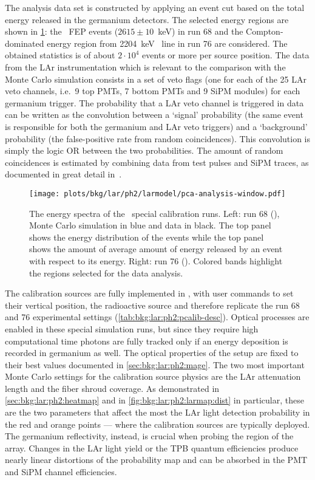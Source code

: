 The analysis data set is constructed by applying an event cut based on the total energy
released in the germanium detectors. The selected energy regions are shown in
\cref{fig:bkg:lar:ph2:pcalib-data}: the \Tl\ FEP events ($2615 \pm 10$~keV) in run 68 and
the Compton-dominated energy region from 2204~keV \Bih\ line in run 76 are considered. The
obtained statistics is of about $2 \cdot 10^4$ events or more per source position.
\newpar
The data from the LAr instrumentation which is relevant to the comparison with the Monte
Carlo simulation consists in a set of veto flags (one for each of the 25 LAr veto
channels, i.e.~9 top PMTs, 7 bottom PMTs and 9 SiPM modules) for each germanium trigger.
The probability that a LAr veto channel is triggered in data can be written as the
convolution between a `signal' probability (the same event is responsible for both the
germanium and LAr veto triggers) and a `background' probability (the false-positive rate
from random coincidences). This convolution is simply the logic OR between the two
probabilities. The amount of random coincidences is estimated by combining data from test
pulses and SiPM traces, as documented in great detail in~\cite{Wiesinger2021}.

\begin{figure}
  \centering
  \texttt{[image: plots/bkg/lar/ph2/larmodel/pca-analysis-window.pdf]}
  \caption{%
    The energy spectra of the \phasetwo\ special calibration runs. Left: run 68 (\Th),
    Monte Carlo simulation in blue and data in black. The top panel shows the energy
    distribution of the events while the top panel shows the amount of average amount of
    energy released by an event with respect to its energy. Right: run 76 (\Ra). Colored
    bands highlight the regions selected for the data analysis.
  }\label{fig:bkg:lar:ph2:pcalib-data}
\end{figure}

The calibration sources are fully implemented in \mage, with user commands to set their
vertical position, the radioactive source and therefore replicate the run 68 and 76
experimental settings (\cref{tab:bkg:lar:ph2:pcalib-desc}). Optical
processes are enabled in these special simulation runs, but since they require high
computational time photons are fully tracked only if an energy deposition is recorded in
germanium as well. The optical properties of the setup are fixed to their best values
documented in \cref{sec:bkg:lar:ph2:mage}. The two most important Monte Carlo settings
for the calibration source physics are the LAr attenuation length and the fiber shroud
coverage. As demonstrated in \cref{sec:bkg:lar:ph2:heatmap} and in
\cref{fig:bkg:lar:ph2:larmap:dist} in particular, these are the two parameters that affect
the most the LAr light detection probability in the red and orange points --- where the
calibration sources are typically deployed. The germanium reflectivity, instead, is
crucial when probing the region of the array. Changes in the LAr light yield or the TPB
quantum efficiencies produce nearly linear distortions of the probability map and can be
absorbed in the PMT and SiPM channel efficiencies.

